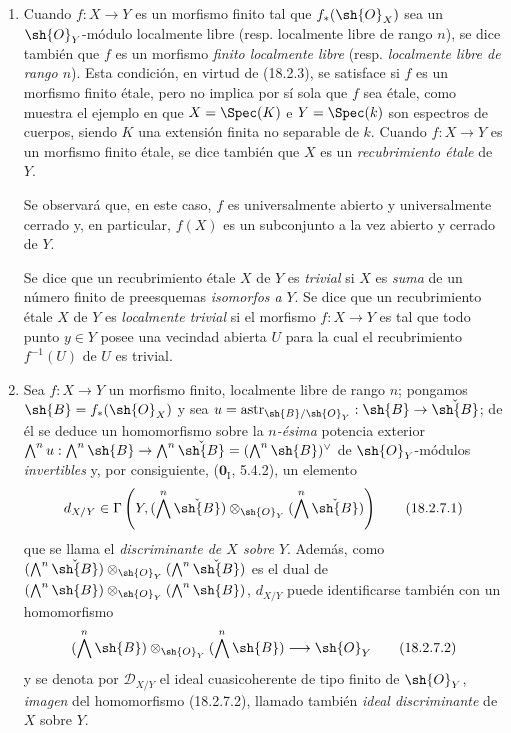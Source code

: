 \begin{remarks}[18.2.7]
\label{IV.18.2.7}
\begin{enumerate}
  \item[(i)] Cuando $f:X\to Y$ es un morfismo finito tal que $f_*(\sh{O}_X)$ sea un $\sh{O}_Y$-módulo localmente libre (resp. localmente libre de rango $n$), se dice también que $f$ es un morfismo \emph{finito localmente libre} (resp. \emph{localmente libre de rango $n$}). Esta condición, en virtud de (18.2.3), se satisface si $f$ es un morfismo finito étale, pero no implica por sí sola que $f$ sea étale, como muestra el ejemplo en que $X=\Spec(K)$ e $Y=\Spec(k)$ son espectros de cuerpos, siendo $K$ una extensión finita no separable de $k$. Cuando $f:X\to Y$ es un morfismo finito étale, se dice también que $X$ es un \emph{recubrimiento étale} de $Y$.

Se observará que, en este caso, $f$ es universalmente abierto y universalmente cerrado y, en particular, $f(X)$ es un subconjunto a la vez abierto y cerrado de $Y$.

Se dice que un recubrimiento étale $X$ de $Y$ es \emph{trivial} si $X$ es \emph{suma} de un número finito de preesquemas \emph{isomorfos a} $Y$. Se dice que un recubrimiento étale $X$ de $Y$ es \emph{localmente trivial} si el morfismo $f:X\to Y$ es tal que todo punto $y\in Y$ posee una vecindad abierta $U$ para la cual el recubrimiento $f^{-1}(U)$ de $U$ es trivial.

  \item[(ii)] Sea $f:X\to Y$ un morfismo finito, localmente libre de rango $n$; pongamos $\sh{B}=f_*(\sh{O}_X)$ y sea $u=\operatorname{astr}_{\sh{B}/\sh{O}_Y}:\sh{B}\to\check{\sh{B}}$; de él se deduce un homomorfismo sobre la \emph{$n$-ésima} potencia exterior
$\bigwedge^n u:\bigwedge^n\sh{B}\to\bigwedge^n\check{\sh{B}}=(\bigwedge^n\sh{B})^\vee$
de $\sh{O}_Y$-módulos \emph{invertibles} y, por consiguiente, ($\mathbf{0}_{\mathrm I}$, 5.4.2), un elemento
\begin{equation}
  d_{X/Y}\in\Gamma\left(Y,(\bigwedge^n\check{\sh{B}})\otimes_{\sh{O}_Y}(\bigwedge^n\check{\sh{B}})\right)
  \tag{18.2.7.1}\label{IV.18.2.7.1}
\end{equation}
que se llama el \emph{discriminante de $X$ sobre $Y$}. Además, como $(\bigwedge^n\check{\sh{B}})\otimes_{\sh{O}_Y}(\bigwedge^n\check{\sh{B}})$ es el dual de $(\bigwedge^n\sh{B})\otimes_{\sh{O}_Y}(\bigwedge^n\sh{B})$, $d_{X/Y}$ puede identificarse también con un homomorfismo
\begin{equation}
  (\bigwedge^n\sh{B})\otimes_{\sh{O}_Y}(\bigwedge^n\sh{B})\longrightarrow\sh{O}_Y
  \tag{18.2.7.2}\label{IV.18.2.7.2}
\end{equation}
y se denota por $\mathscr{D}_{X/Y}$ el ideal cuasicoherente de tipo finito de $\sh{O}_Y$, \emph{imagen} del homomorfismo (18.2.7.2), llamado también \emph{ideal discriminante} de $X$ sobre $Y$.
\end{enumerate}
\end{remarks}

